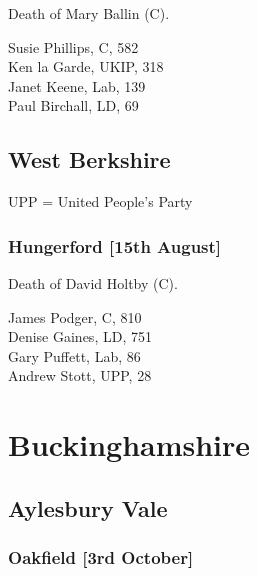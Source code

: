 \documentclass[a4paper,openany,10pt]{book}
\begin{document}

Death of Mary Ballin (C).



Susie Phillips, C, 582\\
Ken la Garde, UKIP, 318\\
Janet Keene, Lab, 139\\
Paul Birchall, LD, 69\\


\subsection*{West Berkshire}

UPP = United People's Party

\subsubsection*{Hungerford \hspace*{\fill}\nolinebreak[1]%
\enspace\hspace*{\fill}
[15th August]}


Death of David Holtby (C).



James Podger, C, 810\\
Denise Gaines, LD, 751\\
Gary Puffett, Lab, 86\\
Andrew Stott, UPP, 28\\


\vfill

\section[Buckinghamshire]{{Buckinghamshire}}

\subsection*{Aylesbury Vale}

\subsubsection*{Oakfield \hspace*{\fill}\nolinebreak[1]%
\enspace\hspace*{\fill}
[3rd October]}
\end{document}
